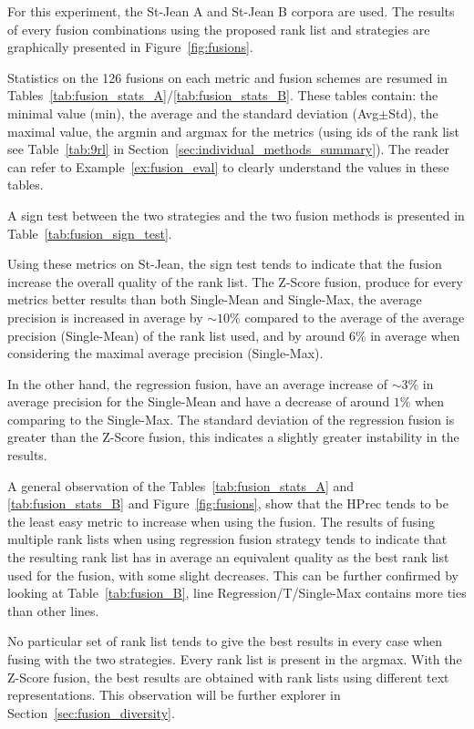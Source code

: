 For this experiment, the St-Jean A and St-Jean B corpora are used.
The results of every fusion combinations using the proposed rank list and strategies are graphically presented in Figure~\ref{fig:fusions}.

Statistics on the 126 fusions on each metric and fusion schemes are resumed in Tables~\ref{tab:fusion_stats_A}/\ref{tab:fusion_stats_B}.
These tables contain: the minimal value (min), the average and the standard deviation (Avg$\pm$Std), the maximal value, the argmin and argmax for the metrics (using ids of the rank list see Table~\ref{tab:9rl} in Section~\ref{sec:individual_methods_summary}).
The reader can refer to Example~\ref{ex:fusion_eval} to clearly understand the values in these tables.

A sign test between the two strategies and the two fusion methods is presented in Table~\ref{tab:fusion_sign_test}.

Using these metrics on St-Jean, the sign test tends to indicate that the fusion increase the overall quality of the rank list.
The Z-Score fusion, produce for every metrics better results than both Single-Mean and Single-Max, the average precision is increased in average by $\sim 10$\% compared to the average of the average precision (Single-Mean) of the rank list used, and by around 6\% in average when considering the maximal average precision (Single-Max).

In the other hand, the regression fusion, have an average increase of $\sim 3$\% in average precision for the Single-Mean and have a decrease of around $1\%$ when comparing to the Single-Max.
The standard deviation of the regression fusion is greater than the Z-Score fusion, this indicates a slightly greater instability in the results.

A general observation of the Tables~\ref{tab:fusion_stats_A} and \ref{tab:fusion_stats_B} and Figure~\ref{fig:fusions}, show that the HPrec tends to be the least easy metric to increase when using the fusion.
The results of fusing multiple rank lists when using regression fusion strategy tends to indicate that the resulting rank list has in average an equivalent quality as the best rank list used for the fusion, with some slight decreases.
This can be further confirmed by looking at Table~\ref{tab:fusion_B}, line Regression/T/Single-Max contains more ties than other lines.

No particular set of rank list tends to give the best results in every case when fusing with the two strategies.
Every rank list is present in the argmax.
With the Z-Score fusion, the best results are obtained with rank lists using different text representations.
This observation will be further explorer in Section~\ref{sec:fusion_diversity}.

